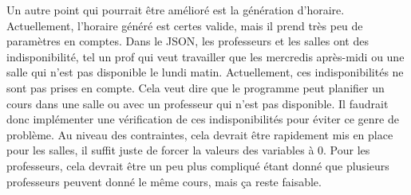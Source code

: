 Un autre point qui pourrait être amélioré est la génération d'horaire. Actuellement, l'horaire généré est certes valide, mais il prend très peu de paramètres en comptes. Dans le JSON, les professeurs et les salles ont des indisponibilité, tel un prof qui veut travailler que les mercredis après-midi ou une salle qui n'est pas disponible le lundi matin. Actuellement, ces indisponibilités ne sont pas prises en compte. Cela veut dire que le programme peut planifier un cours dans une salle ou avec un professeur qui n'est pas disponible. Il faudrait donc implémenter une vérification de ces indisponibilités pour éviter ce genre de problème. Au niveau des contraintes, cela devrait être rapidement mis en place pour les salles, il suffit juste de forcer la valeurs des variables à 0. Pour les professeurs, cela devrait être un peu plus compliqué étant donné que plusieurs professeurs peuvent donné le même cours, mais ça reste faisable.